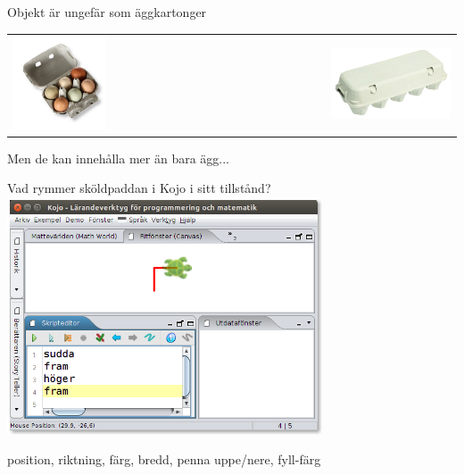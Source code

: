 
\ifkompendium\else
\begin{SlideExtra}{Objekt är ungefär som äggkartonger}
  \begin{tabular}{l r}
    \includegraphics[width=0.5\textwidth]{../img/egg-box}
    &
    \includegraphics[width=0.5\textwidth]{../img/egg-box-closed}
  \end{tabular}
  Men de kan innehålla mer än bara ägg...
\end{SlideExtra}
\fi

\begin{Slide}{Vad rymmer sköldpaddan i Kojo i sitt tillstånd?}
\centering
\includegraphics[width=0.7\textwidth]{../img/kojo}

\pause position, riktning, färg, bredd, penna uppe/nere, fyll-färg
\end{Slide}



